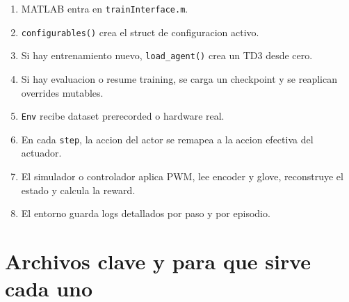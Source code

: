 \documentclass[11pt,a4paper]{article}
\begin{document}
\begin{enumerate}
\item MATLAB entra en \texttt{trainInterface.m}.
\item \texttt{configurables()} crea el struct de configuracion activo.
\item Si hay entrenamiento nuevo, \texttt{load\_agent()} crea un TD3 desde cero.
\item Si hay evaluacion o resume training, se carga un checkpoint y se reaplican overrides mutables.
\item \texttt{Env} recibe dataset prerecorded o hardware real.
\item En cada \texttt{step}, la accion del actor se remapea a la accion efectiva del actuador.
\item El simulador o controlador aplica PWM, lee encoder y glove, reconstruye el estado y calcula la reward.
\item El entorno guarda logs detallados por paso y por episodio.
\end{enumerate}

\section{Archivos clave y para que sirve cada uno}
\end{document}
